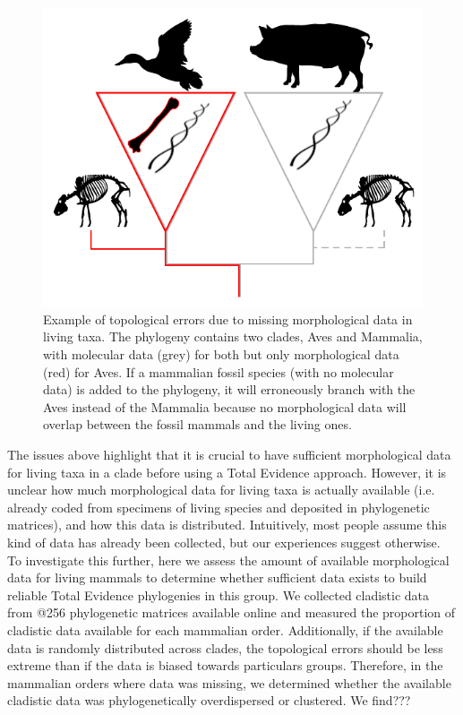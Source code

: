 \documentclass[12pt,letterpaper]{article}
\begin{document}
\begin{figure}[!htbp]
\centering
    \includegraphics[width=1\textwidth]{MissingDataFigure.pdf}
\caption{Example of topological errors due to missing morphological data in living taxa.
The phylogeny contains two clades, Aves and Mammalia, with molecular data (grey) for both but only morphological data (red) for Aves.
If a mammalian fossil species (with no molecular data) is added to the phylogeny, it will erroneously branch with the Aves instead of the Mammalia because no morphological data will overlap between the fossil mammals and the living ones.}
\label{Figure_missing_data_problem}
\end{figure}


The issues above highlight that it is crucial to have sufficient morphological data for living taxa in a clade before using a Total Evidence approach.
However, it is unclear how much morphological data for living taxa is actually available (i.e. already coded from specimens of living species and deposited in phylogenetic matrices), and how this data is distributed.
Intuitively, most people assume this kind of data has already been collected, but our experiences suggest otherwise.
To investigate this further, here we assess the amount of available morphological data for living mammals to determine whether sufficient data exists to build reliable Total Evidence phylogenies in this group.
We collected cladistic data from @256 phylogenetic matrices available online and measured the proportion of cladistic data available for each mammalian order.
Additionally, if the available data is randomly distributed across clades, the topological errors should be less extreme than if the data is biased towards particulars groups.
Therefore, in the mammalian orders where data was missing, we determined whether the available cladistic data was phylogenetically overdispersed or clustered. 
We find???
\end{document}
